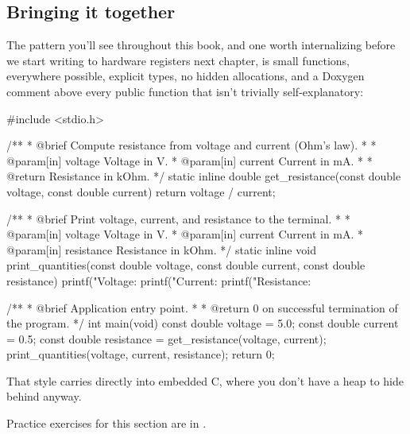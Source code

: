 \subsection{Bringing it together}
\label{c1:a:13}
The pattern you'll see throughout this book, and one worth internalizing before we start writing to
hardware registers next chapter, is small  functions,  everywhere
possible, explicit types, no hidden allocations, and a Doxygen comment above every public function
that isn't trivially self-explanatory:

\begin{ccode}
#include <stdio.h>


/**
 * @brief Compute resistance from voltage and current (Ohm's law).
 *
 * @param[in] voltage Voltage in V.
 * @param[in] current Current in mA.
 *
 * @return Resistance in kOhm.
 */
static inline double get_resistance(const double voltage, const double current)
{
    return voltage / current;
}

/**
 * @brief Print voltage, current, and resistance to the terminal.
 *
 * @param[in] voltage Voltage in V.
 * @param[in] current Current in mA.
 * @param[in] resistance Resistance in kOhm.
 */
static inline void print_quantities(const double voltage, const double current,
                                    const double resistance)
{
    printf("Voltage: %
    printf("Current: %
    printf("Resistance: %
}

/**
 * @brief Application entry point.
 *
 * @return 0 on successful termination of the program.
 */
int main(void)
{
    const double voltage = 5.0;
    const double current = 0.5;
    const double resistance = get_resistance(voltage, current);
    print_quantities(voltage, current, resistance);
    return 0;
}
\end{ccode}

\noindent That style carries directly into embedded C, where you don't have a heap to hide behind
anyway.

Practice exercises for this section are in .

